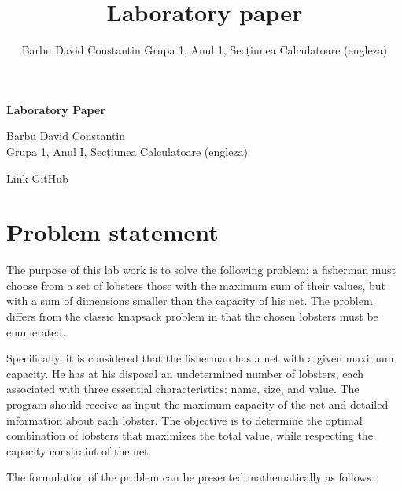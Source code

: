 \documentclass[a4paper,12pt]{article}
\title{Laboratory paper}
\author{Barbu David Constantin
Grupa 1, Anul 1, Secțiunea Calculatoare (engleza)}
\begin{document}
\begin{titlepage}
    \centering
    \vspace*{1cm}
    
    \Huge
    \textbf{Laboratory Paper}
    
    \vspace{2cm}
    
    \LARGE
    Barbu David Constantin \\
    Grupa 1, Anul I, Secțiunea Calculatoare (engleza)
    
    \vfill
    
\end{titlepage}

\newpage

\tableofcontents
\href{http://www.example.com}{Link GitHub}
\newpage

\section{Problem statement}
The purpose of this lab work is to solve the following problem: a fisherman must choose from a set of lobsters those with the maximum sum of their values, but with a sum of dimensions smaller than the capacity of his net. The problem differs from the classic knapsack problem in that the chosen lobsters must be enumerated.

Specifically, it is considered that the fisherman has a net with a given maximum capacity. He has at his disposal an undetermined number of lobsters, each associated with three essential characteristics: name, size, and value. The program should receive as input the maximum capacity of the net and detailed information about each lobster. The objective is to determine the optimal combination of lobsters that maximizes the total value, while respecting the capacity constraint of the net.

The formulation of the problem can be presented mathematically as follows:
\end{document}
